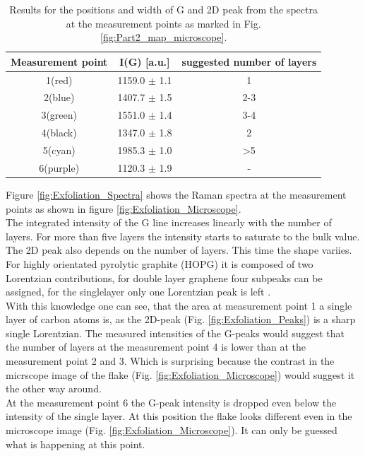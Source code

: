 \documentclass[12pt,a4paper]{article}
\begin{document}
\begin{table}[h]
\centering
\begin{tabular}{|c|c|c|}
\hline 
Measurement point & I(G) [a.u.] & suggested number of layers \\ 
\hline 
1(red) & 1159.0 $\pm$ 1.1 & 1 \\ 
\hline 
2(blue) & 1407.7 $\pm$ 1.5 & 2-3 \\ 
\hline 
3(green) & 1551.0 $\pm$ 1.4 & 3-4 \\ 
\hline 
4(black) & 1347.0 $\pm$ 1.8 & 2 \\ 
\hline 
5(cyan) & 1985.3 $\pm$ 1.0 & >5 \\
\hline 
6(purple) & 1120.3 $\pm$ 1.9 & -  \\ 
\hline 
\end{tabular} 
\caption{Results for the positions and width of G and 2D peak from the spectra at the measurement points as marked in Fig. \ref{fig:Part2_map_microscope}.}
\label{tab:step_G_intensities}
\end{table}

Figure \ref{fig:Exfoliation_Spectra} shows the Raman spectra at the measurement points as shown in figure \ref{fig:Exfoliation_Microscope}. \\
The integrated intensity of the G line increases linearly with the number of layers. For more than five layers the intensity starts to saturate to the bulk value. The 2D peak also depends on the number of layers. This time the shape variies. For highly orientated pyrolytic graphite (HOPG) it is composed of two Lorentzian contributions, for double layer graphene four subpeaks can be assigned, for the singlelayer only one Lorentzian peak is left \cite{Lett_2007}. \\
With this knowledge one can see, that the area at measurement point 1 a single layer of carbon atoms is, as the 2D-peak (Fig. \ref{fig:Exfoliation_Peaks}) is a sharp single Lorentzian. The measured intensities of the G-peaks would suggest that the number of layers at the measurement point 4 is lower than at the measurement point 2 and 3. Which is surprising because the contrast in the micrscope image of the flake (Fig. \ref{fig:Exfoliation_Microscope}) would suggest it the other way around. \\
At the measurement point 6 the G-peak intensity is dropped even below the intensity of the single layer. At this position the flake looks different even in the microscope image (Fig. \ref{fig:Exfoliation_Microscope}). It can only be guessed what is happening at this point.
\end{document}
